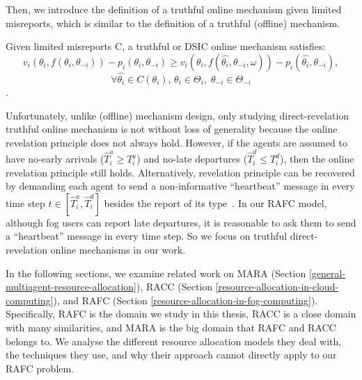 \documentclass[11pt]{phdthesis}
\begin{document}
Then, we introduce the definition of a truthful online mechanism given limited misreports, which is similar to the definition of a truthful (offline) mechanism.

\begin{definition}[truthful]
	Given limited misreports C, a truthful or DSIC online mechanism satisfies:
	\[ v_i(\theta_i,f(\theta_i,\theta_{-i})) - p_i(\theta_i,\theta_{-i}) \geq v_i(\theta_i,f(\hat{\theta_i},\theta_{-i},\omega)) - p_i(\hat{\theta_i},\theta_{-i}), \]
	\[ \forall \hat{\theta_i} \in C(\theta_i), \, \theta_i \in \Theta_i, \;  \theta_{-i} \in \Theta_{-i} \]
	\citep[Definition 16.5]{nisan2007algorithmic}.
\end{definition}


Unfortunately, unlike (offline) mechanism design, only studying direct-revelation truthful online mechanism is not without loss of generality because the online revelation principle does not always hold. However, if the agents are assumed to have no-early arrivals ($ \hat{T}_i^a \geq T_i^a $) and no-late departures ($ \hat{T}_i^d \leq T_i^d $), then the online revelation principle still holds. Alternatively, revelation principle can be recovered by demanding each agent to send a non-informative ``heartbeat'' message in every time step $ t \in [\hat{T}_i^a, \hat{T}_i^d ] $ besides the report of its type~\citep[Section 16.22]{nisan2007algorithmic}. In our RAFC model, although fog users can report late departures, it is reasonable to ask them to send a ``heartbeat'' message in every time step. So we focus on truthful direct-revelation online mechanisms in our work. 

In the following sections, we examine related work on MARA (Section \ref{general-multiagent-resource-allocation}), RACC (Section \ref{resource-allocation-in-cloud-computing}), and RAFC (Section \ref{resource-allocation-in-fog-computing}). Specifically, RAFC is the domain we study in this thesis, RACC is a close domain with many similarities, and MARA is the big domain that RAFC and RACC belongs to. We analyse the different resource allocation models they deal with, the techniques they use, and why their approach cannot directly apply to our RAFC problem.
\end{document}
